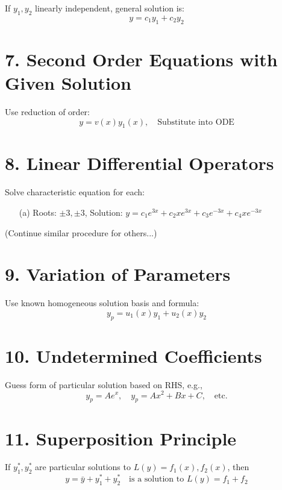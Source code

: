 \documentclass[12pt]{article}
\begin{document}
If \( y_1, y_2 \) linearly independent, general solution is:
\[
y = c_1 y_1 + c_2 y_2
\]

\section*{7. Second Order Equations with Given Solution}

Use reduction of order:
\[
y = v(x) y_1(x), \quad \text{Substitute into ODE}
\]

\section*{8. Linear Differential Operators}

Solve characteristic equation for each:

\begin{enumerate}
  \item[(a)] Roots: \( \pm 3, \pm 3 \), Solution: \( y = c_1 e^{3x} + c_2 x e^{3x} + c_3 e^{-3x} + c_4 x e^{-3x} \)
\end{enumerate}

(Continue similar procedure for others...)

\section*{9. Variation of Parameters}

Use known homogeneous solution basis and formula:
\[
y_p = u_1(x)y_1 + u_2(x)y_2
\]

\section*{10. Undetermined Coefficients}

Guess form of particular solution based on RHS, e.g.,
\[
y_p = Ae^x, \quad y_p = Ax^2 + Bx + C, \quad \text{etc.}
\]

\section*{11. Superposition Principle}

If \( y_1^*, y_2^* \) are particular solutions to \( L(y) = f_1(x), f_2(x) \), then
\[
y = \bar{y} + y_1^* + y_2^* \quad \text{is a solution to } L(y) = f_1 + f_2
\]
\end{document}
